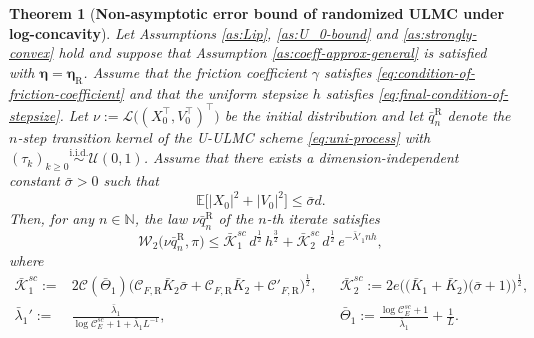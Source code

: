 \documentclass[12pt]{article}
\numberwithin{equation}{section}
\newcommand{\E}{\mathbb{E}}
\newtheorem{thm}{Theorem}[section]
\begin{document}
\begin{thm}[\textbf{Non-asymptotic error bound of randomized ULMC under log-concavity}]
\label{thm:convex-main-result}
Let Assumptions \ref{as:Lip}, \ref{as:U_0-bound} and \ref{as:strongly-convex} hold and suppose that Assumption \ref{as:coeff-approx-general} is satisfied with $\boldsymbol{\eta}=\boldsymbol{\eta}_\mathrm{R}$. 
Assume that the friction coefficient \(\gamma\) satisfies \eqref{eq:condition-of-friction-coefficient} and that the uniform stepsize \(h\) satisfies \eqref{eq:final-condition-of-stepsize}. 
Let
\(
\nu:=\mathcal L\big((X_0^\top,V_0^\top)^\top\big)
\)
be the initial distribution and let \(\bar q_n^\mathrm{R}\) denote the \(n\)-step transition kernel of the U-ULMC scheme \eqref{eq:uni-process} with $(\tau_k)_{k\ge 0}\overset{\text{i.i.d.}}{\sim}\mathcal U(0,1)$.  
Assume that there exists a dimension-independent constant \(\bar \sigma>0\) such that
\begin{equation}
\label{eq:condition-of-initial-value}
\E 
\big[
|X_0|^2  +  |V_0|^2
\big]
\leq
\bar \sigma  d.
\end{equation}
Then, for any \(n\in\mathbb N\), the law \(\nu\bar q^\mathrm{R}_n\) of the \(n\)-th iterate satisfies
\begin{equation}
\label{eq:convex-main-result}
\mathcal W_{2}
\big(
\nu \bar q^\mathrm{R}_n,\pi
\big)
\leq
\bar{\mathcal K}^{sc}_1\,
d^{\frac{1}{2}}\,h^{\frac32}
+
\bar{\mathcal K}^{sc}_2\,
d^{\frac{1}{2}}\,e^{-\bar \lambda'_1 nh},
\end{equation}
where
\begin{align}\label{eq:define-non-asym-constants-convex}
\bar{\mathcal K}^{sc}_1
:=  &
2
    \mathcal C(\bar \Theta_1)
    \big(
    \mathcal C_{F,\mathrm{R}} \bar K_2 
    \bar{\sigma}
    +
    \mathcal C_{F,\mathrm{R}}\bar K_2+ \mathcal C'_{F,\mathrm{R}}
    \big)^{\frac{1}{2}}
,  
& &
\bar{\mathcal K}^{sc}_2
:=  
2e
\Big(
    \big(
    \bar K_1
    +
    \bar K_2
    \big)
    \big(
    \bar \sigma
    +
    1
    \big)
\Big)^{\frac{1}{2}}
,
\\ 
\bar \lambda_1'
:=  &
\tfrac{\bar \lambda_1 }{\log \mathcal C^{sc}_E+1+ \bar \lambda_1 L^{-1}}
,
& &
\bar \Theta_1
  :=     
\tfrac{\log \mathcal C^{sc}_E + 1}{\bar \lambda_1}
+
\tfrac1 L
.
\end{align}
\end{thm}
\end{document}
